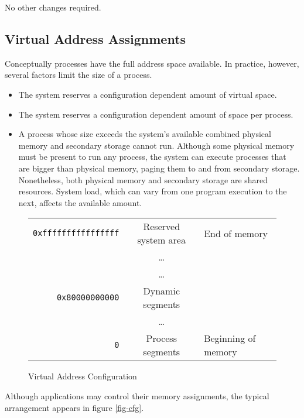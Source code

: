 No other changes required.

\subsection{Virtual Address Assignments}

Conceptually processes have the full address space available.
In practice, however, several factors limit the size of a process.
\begin{itemize}
  \item The system reserves a configuration dependent amount of virtual space.
  \item The system reserves a configuration dependent amount of space per
    process.
  \item
    A process whose size exceeds the system's available combined physical
    memory and secondary storage cannot run. Although some physical memory
    must be present to run any process, the system can execute processes that
    are bigger than physical memory, paging them to and from secondary storage.
    Nonetheless, both physical memory and secondary storage are
    shared resources. System load, which can vary from one program execution
    to the next, affects the available amount.
\end{itemize}

\begin{figure}[H]
\Hrule
  \caption{Virtual Address Configuration}
  \label{fig-address}
  \begin{center}
    \begin{tabular}{r|c|l}
      \noalign{\smallskip}  \cline{2-2}
      \verb|0xffffffffffffffff| & Reserved system area & End of memory\\ 
      & \dots & \\ \cline{2-2}
      & \dots & \\
      \verb|0x80000000000| & Dynamic segments & \\ \cline{2-2}
      & \dots & \\
      \verb|0| & Process segments & Beginning of memory\\ \cline{2-2}
    \end{tabular}
  \end{center}
\Hrule
\end{figure}

Although applications may control their memory assignments, the typical
arrangement appears in figure \ref{fig-cfg}.


